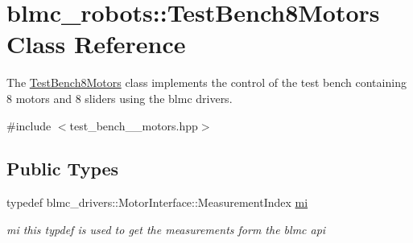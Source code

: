 \hypertarget{classblmc__robots_1_1TestBench8Motors}{}\section{blmc\+\_\+robots\+:\+:Test\+Bench8\+Motors Class Reference}
\label{classblmc__robots_1_1TestBench8Motors}


The \hyperlink{classblmc__robots_1_1TestBench8Motors}{Test\+Bench8\+Motors} class implements the control of the test bench containing 8 motors and 8 sliders using the blmc drivers.  




{\ttfamily \#include $<$test\+\_\+bench\+\_\+\_\+motors.\+hpp$>$}

\subsection*{Public Types}
\begin{DoxyCompactItemize}
\item 
typedef blmc\+\_\+drivers\+::\+Motor\+Interface\+::\+Measurement\+Index \hyperlink{classblmc__robots_1_1TestBench8Motors_a049fd1c22b23b81372f2a57a03bf1303}{mi}\hypertarget{classblmc__robots_1_1TestBench8Motors_a049fd1c22b23b81372f2a57a03bf1303}{}\label{classblmc__robots_1_1TestBench8Motors_a049fd1c22b23b81372f2a57a03bf1303}

\begin{DoxyCompactList}\small\item\em mi this typdef is used to get the measurements form the blmc api \end{DoxyCompactList}\end{DoxyCompactItemize}
